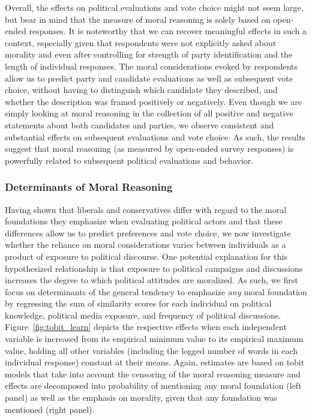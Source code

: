 \documentclass[12pt]{article}
\begin{document}
Overall, the effects on political evaluations and vote choice might not seem large, but bear in mind that the measure of moral reasoning is solely based on open-ended responses. It is noteworthy that we can recover meaningful effects in such a context, especially given that respondents were not explicitly asked about morality and even after controlling for strength of party identification and the length of individual responses. The moral considerations evoked by respondents allow us to predict party and candidate evaluations as well as subsequent vote choice, without having to distinguish which candidate they described, and whether the description was framed positively or negatively. Even though we are simply looking at moral reasoning in the collection of all positive and negative statements about both candidates and parties, we observe consistent and substantial effects on subsequent evaluations and vote choice. As such, the results suggest that moral reasoning (as measured by open-ended survey responses) is powerfully related to subsequent political evaluations and behavior.



\subsubsection{Determinants of Moral Reasoning}

Having shown that liberals and conservatives differ with regard to the moral foundations they emphasize when evaluating political actors and that these differences allow us to predict preferences and vote choice, we now investigate whether the reliance on moral considerations varies between individuals as a product of exposure to political discourse. One potential explanation for this hypothesized relationship is that exposure to political campaigns and discussions increases the degree to which political attitudes are moralized. As such, we first focus on determinants of the general tendency to emphasize \textit{any} moral foundation by regressing the sum of similarity scores for each individual on political knowledge, political media exposure, and frequency of political discussions. Figure~\ref{fig:tobit_learn} depicts the respective effects when each independent variable is increased from its empirical minimum value to its empirical maximum value, holding all other variables (including the logged number of words in each individual response) constant at their means. Again, estimates are based on tobit models that take into account the censoring of the moral reasoning measure and effects are decomposed into probability of mentioning any moral foundation (left panel) as well as the emphasis on morality, given that any foundation was mentioned (right panel).
\end{document}
